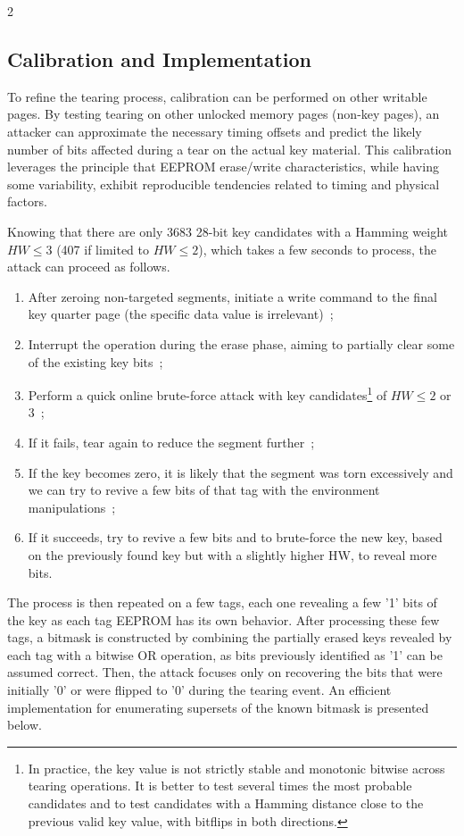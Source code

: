 \documentclass[10pt,letterpaper]{article}
\begin{document}
\begin{multicols}{2}
\subsection{Calibration and Implementation}
\label{sec:tearing_calibration}
To refine the tearing process, calibration can be performed on other writable pages.
By testing tearing on other unlocked memory pages (non-key pages), an attacker can approximate the necessary timing offsets and predict the likely number of bits affected during a tear on the actual key material. This calibration leverages the principle that EEPROM erase/write characteristics, while having some variability, exhibit reproducible tendencies related to timing and physical factors.

Knowing that there are only 3683 28-bit key candidates with a Hamming weight $HW\leq 3$ (407 if limited to $HW\leq 2$), which takes a few seconds to process, the attack can proceed as follows.

\begin{enumerate}
    \item After zeroing non-targeted segments, initiate a write command to the final key quarter page (the specific data value is irrelevant)~;
    \item Interrupt the operation during the erase phase, aiming to partially clear some of the existing key bits~;
    \item Perform a quick online brute-force attack with key candidates\footnote{In practice, the key value is not strictly stable and monotonic bitwise across tearing operations. It is better to test several times the most probable candidates and to test candidates with a Hamming distance close to the previous valid key value, with bitflips in both directions.} of $HW\leq 2$ or 3~;
    \item If it fails, tear again to reduce the segment further~;
    \item If the key becomes zero, it is likely that the segment was torn excessively and we can try to revive a few bits of that tag with the environment manipulations~;
    \item If it succeeds, try to revive a few bits and to brute-force the new key, based on the previously found key but with a slightly higher HW, to reveal more bits.
\end{enumerate}

The process is then repeated on a few tags, each one revealing a few '1' bits of the key as each tag EEPROM has its own behavior.
After processing these few tags, a bitmask is constructed by combining the partially erased keys revealed by each tag with a bitwise OR operation, as bits previously identified as '1' can be assumed correct.
Then, the attack focuses only on recovering the bits that were initially '0' or were flipped to '0' during the tearing event. An efficient implementation for enumerating supersets of the known bitmask is presented below.


\end{multicols}
\end{document}
